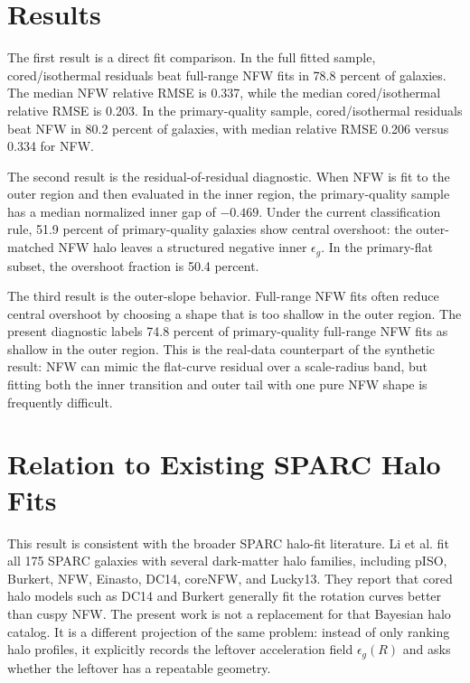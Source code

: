\documentclass[10pt]{article}
\begin{document}
\section{Results}

The first result is a direct fit comparison. In the full fitted sample,
cored/isothermal residuals beat full-range NFW fits in 78.8 percent of
galaxies. The median NFW relative RMSE is 0.337, while the median
cored/isothermal relative RMSE is 0.203. In the primary-quality sample,
cored/isothermal residuals beat NFW in 80.2 percent of galaxies, with median
relative RMSE 0.206 versus 0.334 for NFW.

The second result is the residual-of-residual diagnostic. When NFW is fit to
the outer region and then evaluated in the inner region, the primary-quality
sample has a median normalized inner gap of $-0.469$. Under the current
classification rule, 51.9 percent of primary-quality galaxies show central
overshoot: the outer-matched NFW halo leaves a structured negative inner
$\epsilon_g$. In the primary-flat subset, the overshoot fraction is 50.4
percent.

The third result is the outer-slope behavior. Full-range NFW fits often reduce
central overshoot by choosing a shape that is too shallow in the outer region.
The present diagnostic labels 74.8 percent of primary-quality full-range NFW
fits as shallow in the outer region. This is the real-data counterpart of the
synthetic result: NFW can mimic the flat-curve residual over a scale-radius
band, but fitting both the inner transition and outer tail with one pure NFW
shape is frequently difficult.

\section{Relation to Existing SPARC Halo Fits}

This result is consistent with the broader SPARC halo-fit literature. Li et al.
\citep{Li2020} fit all 175 SPARC galaxies with several dark-matter halo
families, including pISO, Burkert, NFW, Einasto, DC14, coreNFW, and Lucky13.
They report that cored halo models such as DC14 and Burkert generally fit the
rotation curves better than cuspy NFW. The present work is not a replacement
for that Bayesian halo catalog. It is a different projection of the same
problem: instead of only ranking halo profiles, it explicitly records the
leftover acceleration field $\epsilon_g(R)$ and asks whether the leftover has a
repeatable geometry.
\end{document}
